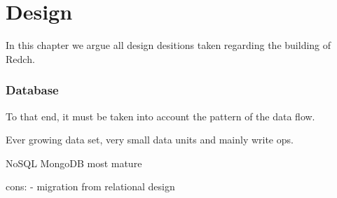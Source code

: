 \chapter{Design}

In this chapter we argue all design desitions taken regarding the building of Redch. 

\subsection{Database}

To that end, it must be taken into account the pattern of the data flow.
  
Ever growing data set, very small data units and mainly write ops.


NoSQL
MongoDB most mature

cons: 
- migration from relational design